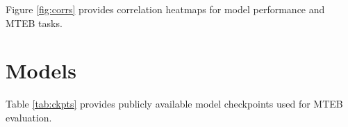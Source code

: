 \documentclass[11pt]{article}
\begin{document}
Figure \ref{fig:corrs} provides correlation heatmaps for model performance and MTEB tasks.

\begin{figure*}
    \centering
    \qquad
    \caption{Pearson correlations across model and task results. \textbf{Left:} Size variants of the same architecture show high correlations. \textbf{Right:} Performance on clustering and reranking correlates strongest, while summarization and classification show weaker correlation with other tasks.}
    \label{fig:corrs}
\end{figure*}

\section{Models}
\label{sec:appmodels}

Table \ref{tab:ckpts} provides publicly available model checkpoints used for MTEB evaluation.
\end{document}
